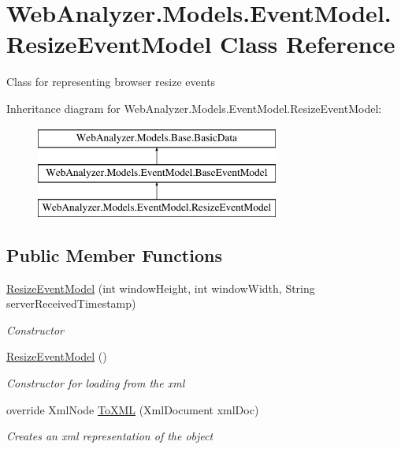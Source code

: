 \hypertarget{class_web_analyzer_1_1_models_1_1_event_model_1_1_resize_event_model}{}\section{Web\+Analyzer.\+Models.\+Event\+Model.\+Resize\+Event\+Model Class Reference}
\label{class_web_analyzer_1_1_models_1_1_event_model_1_1_resize_event_model}


Class for representing browser resize events  


Inheritance diagram for Web\+Analyzer.\+Models.\+Event\+Model.\+Resize\+Event\+Model\+:\begin{figure}[H]
\begin{center}
\leavevmode
\includegraphics[height=3.000000cm]{class_web_analyzer_1_1_models_1_1_event_model_1_1_resize_event_model}
\end{center}
\end{figure}
\subsection*{Public Member Functions}
\begin{DoxyCompactItemize}
\item 
\hyperlink{class_web_analyzer_1_1_models_1_1_event_model_1_1_resize_event_model_ae60fbe903d44770db6d6f3999658eca2}{Resize\+Event\+Model} (int window\+Height, int window\+Width, String server\+Received\+Timestamp)
\begin{DoxyCompactList}\small\item\em Constructor \end{DoxyCompactList}\item 
\hyperlink{class_web_analyzer_1_1_models_1_1_event_model_1_1_resize_event_model_ac851f00528b0f87058e64b64945e464e}{Resize\+Event\+Model} ()
\begin{DoxyCompactList}\small\item\em Constructor for loading from the xml \end{DoxyCompactList}\item 
override Xml\+Node \hyperlink{class_web_analyzer_1_1_models_1_1_event_model_1_1_resize_event_model_a55f5533548b548490cfb7342f075f8e0}{To\+X\+M\+L} (Xml\+Document xml\+Doc)
\begin{DoxyCompactList}\small\item\em Creates an xml representation of the object \end{DoxyCompactList}\end{DoxyCompactItemize}

